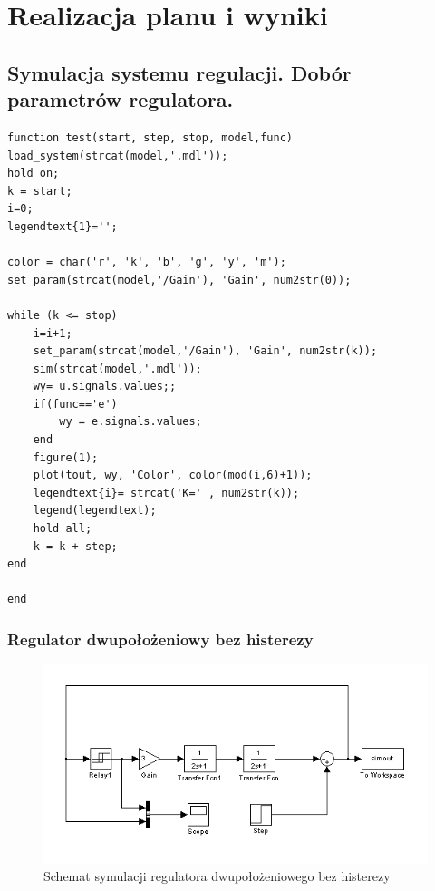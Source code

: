 \documentclass[a4paper,10pt]{article}
\begin{document}
\newpage
\section{Realizacja planu i wyniki}
\subsection{Symulacja systemu regulacji. Dobór parametrów regulatora.}\label{sec:zad1}

\begin{lstlisting}[caption=Funkcja testująca regulator]
function test(start, step, stop, model,func)
load_system(strcat(model,'.mdl'));
hold on;
k = start;
i=0;
legendtext{1}='';

color = char('r', 'k', 'b', 'g', 'y', 'm');
set_param(strcat(model,'/Gain'), 'Gain', num2str(0));

while (k <= stop)
    i=i+1;
    set_param(strcat(model,'/Gain'), 'Gain', num2str(k));
    sim(strcat(model,'.mdl'));
    wy= u.signals.values;;
    if(func=='e')
        wy = e.signals.values;    
    end
    figure(1);
    plot(tout, wy, 'Color', color(mod(i,6)+1));        
    legendtext{i}= strcat('K=' , num2str(k));
    legend(legendtext);
    hold all;     
    k = k + step;    
end

end
\end{lstlisting}


\subsubsection{Regulator dwupołożeniowy bez histerezy}\label{sec:r2bh}
\begin{figure}[h]
    \centering
	\includegraphics[width=120mm]{CW3-schemat-2bez.png}
	\caption{Schemat symulacji regulatora dwupołożeniowego bez histerezy}
    \label{fig:Rysunek}
\end{figure}
\end{document}
